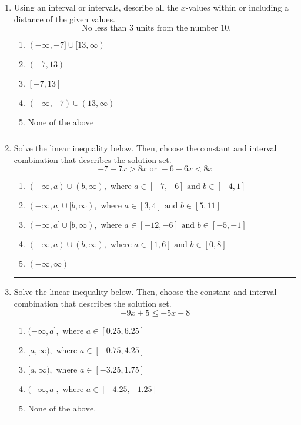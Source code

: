 \documentclass[14pt]{extbook}
\newcommand{\litem}[1]{\item#1\hspace*{-1cm}\rule{\textwidth}{0.4pt}}
\begin{document}
\begin{enumerate}
{\begin{enumerate}[label=\Alph*.]
\end{enumerate} }
\litem{
Using an interval or intervals, describe all the $x$-values within or including a distance of the given values.\[ \text{ No less than } 3 \text{ units from the number } 10. \]\begin{enumerate}[label=\Alph*.]
\item \( (-\infty, -7] \cup [13, \infty) \)
\item \( (-7, 13) \)
\item \( [-7, 13] \)
\item \( (-\infty, -7) \cup (13, \infty) \)
\item \( \text{None of the above} \)

\end{enumerate} }
\litem{
Solve the linear inequality below. Then, choose the constant and interval combination that describes the solution set.\[ -7 + 7 x > 8 x \text{ or } -6 + 6 x < 8 x \]\begin{enumerate}[label=\Alph*.]
\item \( (-\infty, a) \cup (b, \infty), \text{ where } a \in [-7, -6] \text{ and } b \in [-4, 1] \)
\item \( (-\infty, a] \cup [b, \infty), \text{ where } a \in [3, 4] \text{ and } b \in [5, 11] \)
\item \( (-\infty, a] \cup [b, \infty), \text{ where } a \in [-12, -6] \text{ and } b \in [-5, -1] \)
\item \( (-\infty, a) \cup (b, \infty), \text{ where } a \in [1, 6] \text{ and } b \in [0, 8] \)
\item \( (-\infty, \infty) \)

\end{enumerate} }
\litem{
Solve the linear inequality below. Then, choose the constant and interval combination that describes the solution set.\[ -9x + 5 \leq -5x -8 \]\begin{enumerate}[label=\Alph*.]
\item \( (-\infty, a], \text{ where } a \in [0.25, 6.25] \)
\item \( [a, \infty), \text{ where } a \in [-0.75, 4.25] \)
\item \( [a, \infty), \text{ where } a \in [-3.25, 1.75] \)
\item \( (-\infty, a], \text{ where } a \in [-4.25, -1.25] \)
\item \( \text{None of the above}. \)


\end{enumerate}}
\end{enumerate}
\end{document}
